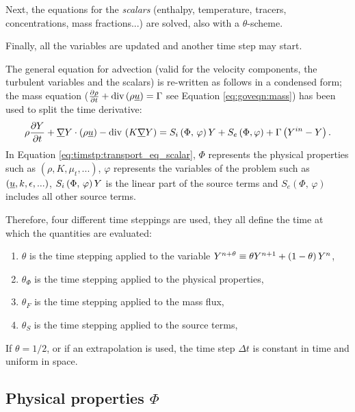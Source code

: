 Next, the equations for the \emph{scalars} (enthalpy, temperature, tracers,
concentrations, mass fractions...) are solved, also with a $\theta$-scheme.

Finally, all the variables are updated and another time step may start.

The general equation for advection (valid for the velocity components, the
turbulent variables and the scalars) is re-written as follows in a condensed
form; the mass equation ($\frac{\partial \rho } {\partial t}+ \text{div}\,(\rho
\underline{u}) = \Gamma$ see Equation \eqref{eq:goveqn:mass}) has been used to split the time derivative:
%
\begin{equation}\label{eq:timstp:transport_eq_scalar}
\rho \dfrac{\partial Y}{\partial t} + \underline{\nabla} Y \cdot \left(\rho \underline{u} \right)
- \text{div}\, \left(K \underline{\nabla} Y \right) = S_{i}\left(\Phi, \, \varphi\right) Y + S_{e}\left(\Phi,\varphi \right)
+ \Gamma \left(Y^{in} - Y \right).
\end{equation}
In Equation \eqref{eq:timstp:transport_eq_scalar}, $\Phi$ represents the physical properties such as $(\rho,K,\mu_{t},...)$,
$\varphi$ represents the variables of the problem such as $(\underline{u},k,\epsilon,...)$,
$S_{i}\left(\Phi, \, \varphi \right) Y$ is the linear part of the source terms
and
$S_{e} \left(\Phi, \, \varphi \right)$  includes all other source terms.

Therefore, four different time steppings are used, they all define the time at which the quantities are evaluated:
%
\begin{enumerate}[ label=\roman{*}/, ref=(\roman{*})]
\item $\theta$ is the time stepping applied to the variable $Y^{n+\theta} \equiv \theta Y^{n+1} + \left( 1 - \theta \right) Y^n$,
\item $\theta_\Phi$ is the time stepping applied to the physical properties,
\item $\theta_F$ is the time stepping applied to the mass flux,
\item $\theta_S$ is the time stepping applied to the source terms,
\end{enumerate}
%

If $\theta=1/2$, or if an extrapolation is used, the time step $\Delta t$ is
constant in time and uniform in space.

\subsection{Physical properties $\Phi$}

